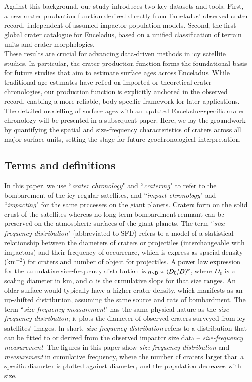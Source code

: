 \documentclass[preprint,11pt,3p,times,authoryear]{elsarticle}
\begin{document}
Against this background, our study introduces two key datasets and tools. First, a new crater production function derived directly from Enceladus’ observed crater record, independent of assumed impactor population models. Second, the first global crater catalogue for Enceladus, based on a unified classification of terrain units and crater morphologies. \\

These results are crucial for advancing data-driven methods in icy satellite studies. In particular, the crater production function forms the foundational basis for future studies that aim to estimate surface ages across Enceladus. While traditional age estimates have relied on imported or theoretical crater chronologies, our production function is explicitly anchored in the observed record, enabling a more reliable, body-specific framework for later applications. \\

The detailed modelling of surface ages with an updated Enceladus-specific crater chronology will be presented in a subsequent paper. Here, we lay the groundwork by quantifying the spatial and size-frequency characteristics of craters across all major surface units, setting the stage for future geochronological interpretation.

\subsection{Terms and definitions}
\label{term&def}
In this paper, we use ``{\it crater chronology}" and ``{\it cratering}" to refer to the bombardment of the icy regular satellites, and ``{\it impact chronology}" and ``{\it impacting}" for the same processes on the giant planets. Craters form on the solid crust of the satellites whereas no long-term bombardment remnant can be preserved on the atmospheric surfaces of the giant planets. The term
``{\it size-frequency distribution}" (abbreviated to SFD) refers to a model of a statistical relationship between the diameters of craters or projectiles (interchangeable with impactors) and their frequency of occurrence, which is express as spacial density (km$^{-2}$) for craters and number of object for projectiles. A power law expression for the cumulative size-frequency distribution is $n_{\rm >D} \propto (D_0/D)^\alpha$, %
where $D_0$ is a scaling diameter in km, and $\alpha$ is the cumulative slope for that size ranges.
An older surface would typically have a higher crater density, which manifests as an up-shifted distribution, assuming the same source and rate of bombardment. The term ``{\it size-frequency measurement}" has the same physical nature as the {\it size-frequency distribution}; it plots the diameter of observed craters surveyed from icy satellites' images. In short, {\it size-frequency distribution} refers to a distribution that can be fitted to or derived from the observed impactor size data -- {\it size-frequency measurement}. The figures in this paper show {\it size-frequency distribution} and {\it measurement} in cumulative frequency, where the number of craters larger than a specific diameter is plotted against diameter, and the population decreases with size. \\
\end{document}
